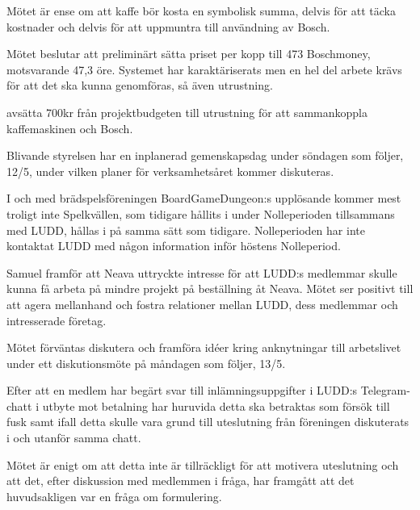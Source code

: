 \documentclass{protokoll}
\begin{document}
 Mötet är ense om att kaffe bör kosta en symbolisk summa, delvis för att täcka
 kostnader och delvis för att uppmuntra till användning av Bosch. 


Mötet beslutar att preliminärt sätta priset per kopp till 473 Boschmoney,
motsvarande 47,3 öre.
 Systemet har karaktäriserats men en hel del arbete krävs för att det ska kunna
 genomföras, så även utrustning.
\begin{beslut}
  \att avsätta 700kr från projektbudgeten till utrustning för att sammankoppla
  kaffemaskinen och Bosch.
\end{beslut}
Blivande styrelsen har en inplanerad gemenskapsdag under söndagen som följer,
12/5, under vilken planer för verksamhetsåret kommer diskuteras. 

I och med brädspelsföreningen BoardGameDungeon:s upplösande kommer mest troligt 
inte Spelkvällen, som tidigare hållits i under Nolleperioden tillsammans med 
LUDD, hållas i på samma sätt som tidigare. Nolleperioden har inte kontaktat
LUDD med någon information inför höstens Nolleperiod.


Samuel framför att Neava uttryckte intresse för att LUDD:s medlemmar skulle
kunna få arbeta på mindre projekt på beställning åt Neava. Mötet ser positivt
till att agera mellanhand och fostra relationer mellan LUDD, dess medlemmar och
intresserade företag. 

Mötet förväntas diskutera och framföra idéer kring anknytningar till
arbetslivet under ett diskutionsmöte på måndagen som följer, 13/5.

Efter att en medlem har begärt svar till inlämningsuppgifter i LUDD:s
Telegram-chatt i utbyte mot betalning har huruvida detta ska betraktas som
försök till fusk samt ifall detta skulle vara grund till uteslutning från
föreningen diskuterats i och utanför samma chatt. 

Mötet är enigt om att detta inte är tillräckligt för att motivera uteslutning
och att det, efter diskussion med medlemmen i fråga, har framgått att det
huvudsakligen var en fråga om formulering.
\end{document}
